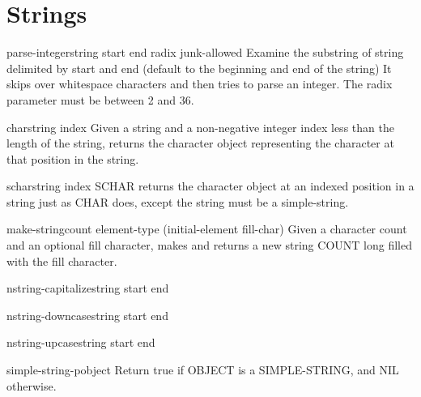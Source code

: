 \chapter{Strings}

\begin{function}{parse-integer}{string \key start end radix junk-allowed}{}{}
  Examine the substring of string delimited by start and end
  (default to the beginning and end of the string)  It skips over
  whitespace characters and then tries to parse an integer. The
  radix parameter must be between 2 and 36.
\end{function}

\begin{accessor}{char}{string index}{}{}
  Given a string and a non-negative integer index less than the length of
  the string, returns the character object representing the character at
  that position in the string.
\end{accessor}

\begin{accessor}{schar}{string index}{}{}
  SCHAR returns the character object at an indexed position in a string
   just as CHAR does, except the string must be a simple-string.
\end{accessor}

\begin{function}{make-string}{count \key element-type (initial-element fill-char)}{}{}
  Given a character count and an optional fill character, makes and returns a
new string COUNT long filled with the fill character.
\end{function}

\begin{function}{nstring-capitalize}{string \key start end}{}{}
  
\end{function}

\begin{function}{nstring-downcase}{string \key start end}{}{}
  
\end{function}

\begin{function}{nstring-upcase}{string \key start end}{}{}
  
\end{function}

\begin{function}{simple-string-p}{object}{}{}
  Return true if OBJECT is a SIMPLE-STRING, and NIL otherwise.
\end{function}

